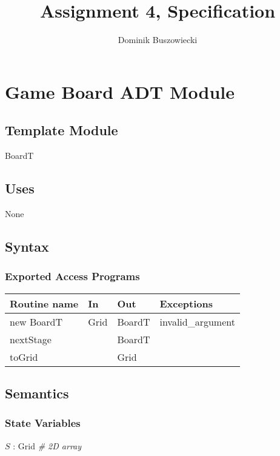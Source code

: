 \documentclass[12pt]{article}
\title{Assignment 4, Specification}
\author{Dominik Buszowiecki}
\begin{document}
\maketitle

\newpage

\section* {Game Board ADT Module}

\subsection*{Template Module}

BoardT

\subsection* {Uses}

\noindent None

\subsection* {Syntax}

\subsubsection* {Exported Access Programs}

\begin{tabular}{| l | l | l | l |}
\hline
\textbf{Routine name} & \textbf{In} & \textbf{Out} & \textbf{Exceptions}\\
\hline
new BoardT  & Grid & BoardT & invalid\_argument\\
\hline
nextStage & & BoardT & \\
\hline
  toGrid & & Grid & \\
\hline
\end{tabular}

\subsection* {Semantics}

\subsubsection* {State Variables}

$S$ : Grid \textit{\# 2D array}
\end{document}
